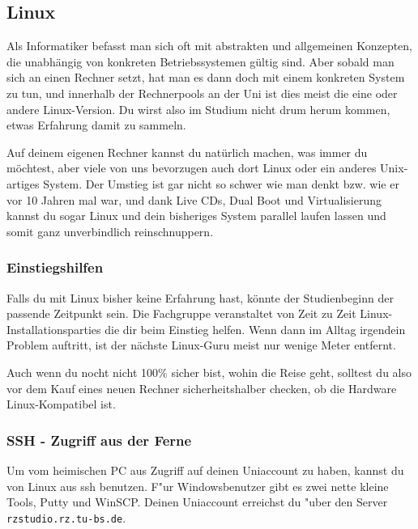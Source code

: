 \subsection{Linux}
\label{linux}
Als Informatiker befasst man sich oft mit abstrakten und allgemeinen 
Konzepten, die unabhängig von konkreten Betriebssystemen gültig sind. 
Aber sobald man sich an einen Rechner setzt, hat man es dann doch mit 
einem konkreten System zu tun, und innerhalb der Rechnerpools an der Uni
ist dies meist die eine oder andere Linux-Version. Du wirst also im 
Studium nicht drum herum kommen, etwas Erfahrung damit zu sammeln.

Auf deinem eigenen Rechner kannst du natürlich machen,
was immer du möchtest, aber viele von uns bevorzugen auch dort Linux
oder ein anderes Unix-artiges System. Der Umstieg ist gar nicht so
schwer wie man denkt bzw. wie er vor 10 Jahren mal war, und dank Live CDs,
Dual Boot und Virtualisierung kannst du sogar Linux und dein bisheriges 
System parallel laufen lassen und somit ganz unverbindlich reinschnuppern.

\subsubsection{Einstiegshilfen}
Falls du mit Linux bisher keine Erfahrung hast, könnte der Studienbeginn
 der passende Zeitpunkt sein. Die Fachgruppe veranstaltet von Zeit zu Zeit 
Linux-Installationsparties die dir beim Einstieg helfen. Wenn dann im Alltag
irgendein Problem auftritt, ist der nächste Linux-Guru meist nur wenige
Meter entfernt.

Auch wenn du nocht nicht 100\% sicher bist, wohin die Reise geht, solltest 
du also vor dem Kauf eines neuen Rechner sicherheitshalber checken, ob die 
Hardware Linux-Kompatibel ist.


\subsubsection{SSH - Zugriff aus der Ferne}
Um vom heimischen PC aus Zugriff auf deinen Uniaccount zu haben, kannst
du von Linux aus ssh benutzen. F"ur Windowsbenutzer gibt es zwei nette
kleine Tools, Putty und WinSCP. Deinen Uniaccount erreichst du "uber
den Server \texttt{rzstudio.rz.tu-bs.de}.%

